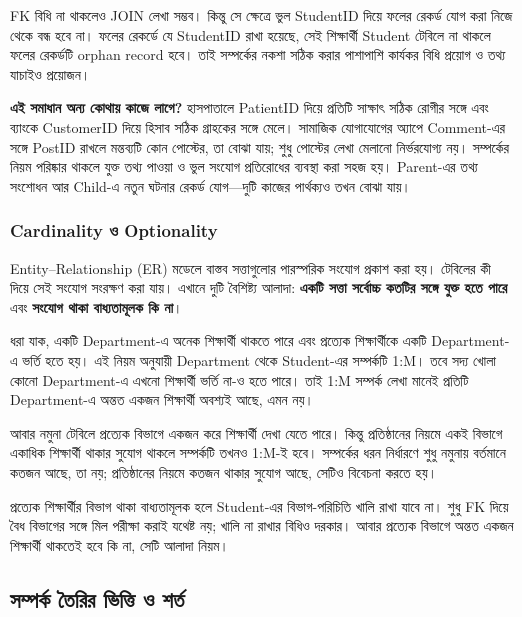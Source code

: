 FK বিধি না থাকলেও JOIN লেখা সম্ভব। কিন্তু সে ক্ষেত্রে ভুল StudentID দিয়ে ফলের রেকর্ড যোগ করা নিজে থেকে বন্ধ হবে না। ফলের রেকর্ডে যে StudentID রাখা হয়েছে, সেই শিক্ষার্থী Student টেবিলে না থাকলে ফলের রেকর্ডটি orphan record হবে। তাই সম্পর্কের নকশা সঠিক করার পাশাপাশি কার্যকর বিধি প্রয়োগ ও তথ্য যাচাইও প্রয়োজন।


\textbf{এই সমাধান অন্য কোথায় কাজে লাগে?} হাসপাতালে PatientID দিয়ে প্রতিটি সাক্ষাৎ সঠিক রোগীর সঙ্গে এবং ব্যাংকে CustomerID দিয়ে হিসাব সঠিক গ্রাহকের সঙ্গে মেলে। সামাজিক যোগাযোগের অ্যাপে Comment-এর সঙ্গে PostID রাখলে মন্তব্যটি কোন পোস্টের, তা বোঝা যায়; শুধু পোস্টের লেখা মেলানো নির্ভরযোগ্য নয়। সম্পর্কের নিয়ম পরিষ্কার থাকলে যুক্ত তথ্য পাওয়া ও ভুল সংযোগ প্রতিরোধের ব্যবস্থা করা সহজ হয়। Parent-এর তথ্য সংশোধন আর Child-এ নতুন ঘটনার রেকর্ড যোগ—দুটি কাজের পার্থক্যও তখন বোঝা যায়।

\subsubsection{Cardinality ও Optionality}
Entity–Relationship (ER) মডেলে বাস্তব সত্তাগুলোর পারস্পরিক সংযোগ প্রকাশ করা হয়। টেবিলের কী দিয়ে সেই সংযোগ সংরক্ষণ করা যায়। এখানে দুটি বৈশিষ্ট্য আলাদা: \textbf{একটি সত্তা সর্বোচ্চ কতটির সঙ্গে যুক্ত হতে পারে} এবং \textbf{সংযোগ থাকা বাধ্যতামূলক কি না}।

ধরা যাক, একটি Department-এ অনেক শিক্ষার্থী থাকতে পারে এবং প্রত্যেক শিক্ষার্থীকে একটি Department-এ ভর্তি হতে হয়। এই নিয়ম অনুযায়ী Department থেকে Student-এর সম্পর্কটি 1:M। তবে সদ্য খোলা কোনো Department-এ এখনো শিক্ষার্থী ভর্তি না-ও হতে পারে। তাই 1:M সম্পর্ক লেখা মানেই প্রতিটি Department-এ অন্তত একজন শিক্ষার্থী অবশ্যই আছে, এমন নয়।

আবার নমুনা টেবিলে প্রত্যেক বিভাগে একজন করে শিক্ষার্থী দেখা যেতে পারে। কিন্তু প্রতিষ্ঠানের নিয়মে একই বিভাগে একাধিক শিক্ষার্থী থাকার সুযোগ থাকলে সম্পর্কটি তখনও 1:M-ই হবে। সম্পর্কের ধরন নির্ধারণে শুধু নমুনায় বর্তমানে কতজন আছে, তা নয়; প্রতিষ্ঠানের নিয়মে কতজন থাকার সুযোগ আছে, সেটিও বিবেচনা করতে হয়।

প্রত্যেক শিক্ষার্থীর বিভাগ থাকা বাধ্যতামূলক হলে Student-এর বিভাগ-পরিচিতি খালি রাখা যাবে না। শুধু FK দিয়ে বৈধ বিভাগের সঙ্গে মিল পরীক্ষা করাই যথেষ্ট নয়; খালি না রাখার বিধিও দরকার। আবার প্রত্যেক বিভাগে অন্তত একজন শিক্ষার্থী থাকতেই হবে কি না, সেটি আলাদা নিয়ম।


\subsection{সম্পর্ক তৈরির ভিত্তি ও শর্ত}


